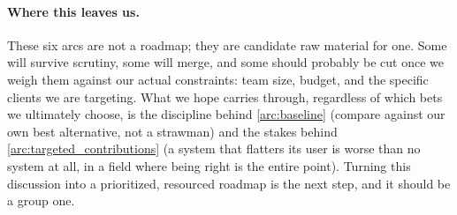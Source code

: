 \paragraph{Where this leaves us.}
These six arcs are not a roadmap; they are candidate raw material for one. Some will survive scrutiny, some will merge, and some should probably be cut once we weigh them against our actual constraints: team size, budget, and the specific clients we are targeting. What we hope carries through, regardless of which bets we ultimately choose, is the discipline behind \ref{arc:baseline} (compare against our own best alternative, not a strawman) and the stakes behind \ref{arc:targeted_contributions} (a system that flatters its user is worse than no system at all, in a field where being right is the entire point). Turning this discussion into a prioritized, resourced roadmap is the next step, and it should be a group one.


\renewcommand{\thesubsection}{\Alph{section}.\arabic{subsection}}
